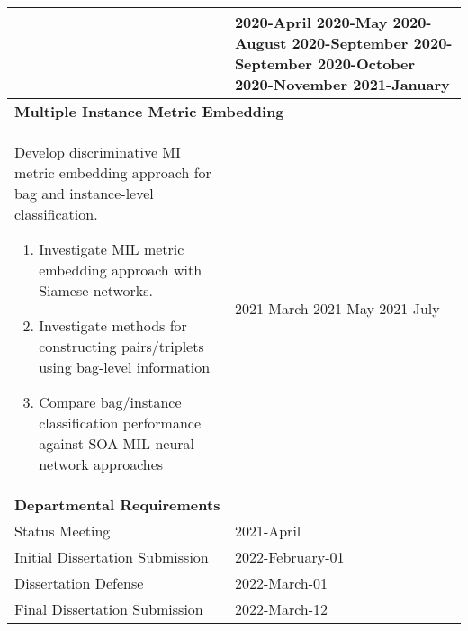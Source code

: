 \begin{longtable}{|p{}|p{}|}
\begin{enumerate}
	\end{enumerate} & \newline \vspace{1cm} 2020-April \newline \vspace{4.8cm} 2020-May \newline \vspace{2.6cm} 2020-August \newline \vspace{0.6cm} 2020-September \newline \vspace{0.6cm} 2020-September \newline \vspace{1cm} 2020-October \newline \vspace{0.6cm} 2020-November\newline \vspace{0.7cm} 2021-January\\ 
	\hline
	\multicolumn{2}{|l|}{\textbf{Multiple Instance Metric Embedding}} \\
	\hline
	Develop discriminative MI metric embedding approach for bag and instance-level classification. 
	\begin{enumerate}
		\item Investigate MIL metric embedding approach with Siamese networks.
		\item Investigate methods for constructing pairs/triplets using bag-level information
		\item Compare bag/instance classification performance against SOA MIL neural network approaches
	\end{enumerate} & \newline \vspace{1.1cm} 2021-March \newline \vspace{0.6cm} 2021-May \newline \vspace{0.6cm} 2021-July\\
	\hline
	\multicolumn{2}{|l|}{\textbf{Departmental Requirements}} \\
	\hline
	Status Meeting & 2021-April\\
	\hline
	Initial Dissertation Submission & 2022-February-01\\
	\hline
	Dissertation Defense & 2022-March-01\\
	\hline
	Final Dissertation Submission & 2022-March-12\\

\end{longtable}


